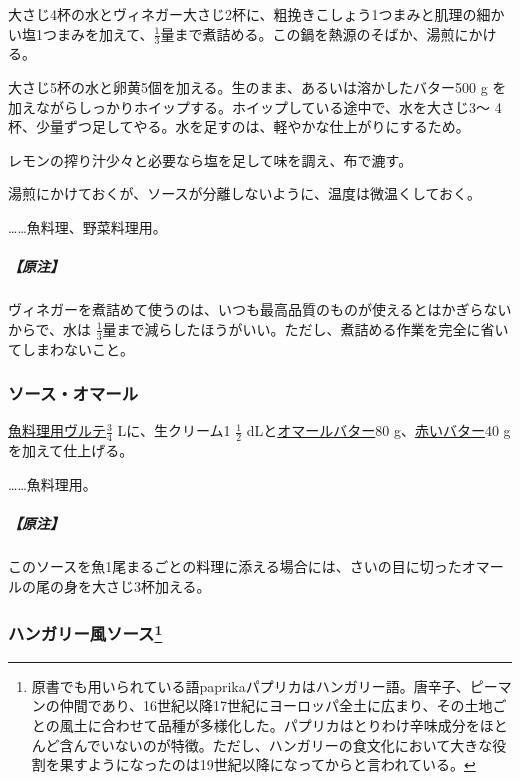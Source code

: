 \begin{recette}
大さじ4杯の水とヴィネガー大さじ2杯に、粗挽きこしょう1つまみと肌理の細かい塩1つまみを加えて、\(\frac{1}{3}\)量まで煮詰める。この鍋を熱源のそばか、湯煎にかける。

大さじ5杯の水と卵黄5個を加える。生のまま、あるいは溶かしたバター500 g
を加えながらしっかりホイップする。ホイップしている途中で、水を大さじ3〜
4杯、少量ずつ足してやる。水を足すのは、軽やかな仕上がりにするため。

レモンの搾り汁少々と必要なら塩を足して味を調え、布で漉す。

湯煎にかけておくが、ソースが分離しないように、温度は微温くしておく。

\ldots{}\ldots{}魚料理、野菜料理用。

\hypertarget{nota-sauce-hollandaise}{%
\subparagraph{【原注】}\label{nota-sauce-hollandaise}}

ヴィネガーを煮詰めて使うのは、いつも最高品質のものが使えるとはかぎらないからで、水は
\(\frac{1}{3}\)量まで減らしたほうがいい。ただし、煮詰める作業を完全に省いてしまわないこと。

\hypertarget{sauce-homard}{%
\subsubsection{ソース・オマール}\label{sauce-homard}}



\protect\hyperlink{veloute-de-poisson}{魚料理用ヴルテ}\(\frac{3}{4}\)
Lに、生クリーム1 \(\frac{1}{2}\)
dLと\protect\hyperlink{beurre-de-homard}{オマールバター}80
g、\protect\hyperlink{beurre-colorant-rouge}{赤いバター}40
gを加えて仕上げる。

\ldots{}\ldots{}魚料理用。

\hypertarget{nota-sauce-homard}{%
\subparagraph{【原注】}\label{nota-sauce-homard}}

このソースを魚1尾まるごとの料理に添える場合には、さいの目に切ったオマールの尾の身を大さじ3杯加える。

\hypertarget{sauce-hongroise}{%
\subsubsection[ハンガリー風ソース]{\texorpdfstring{ハンガリー風ソース\footnote{原書でも用いられている語paprikaパプリカはハンガリー語。唐辛子、ピーマンの仲間であり、16世紀以降17世紀にヨーロッパ全土に広まり、その土地ごとの風土に合わせて品種が多様化した。パプリカはとりわけ辛味成分をほとんど含んでいないのが特徴。ただし、ハンガリーの食文化において大きな役割を果すようになったのは19世紀以降になってからと言われている。}}{ハンガリー風ソース}}\label{sauce-hongroise}}


\end{recette}
